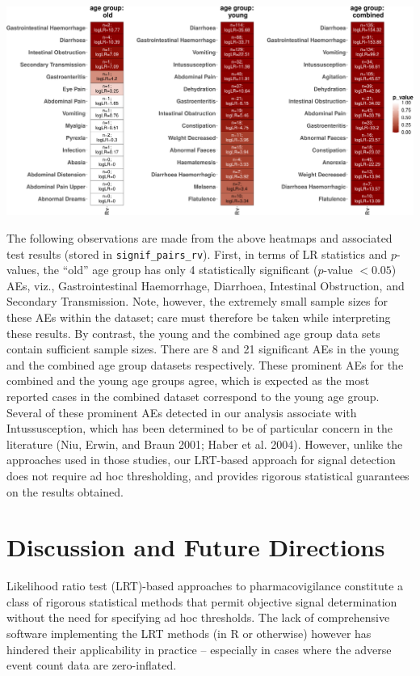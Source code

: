 \begin{center}\includegraphics[width=1\linewidth]{pvlrt-package-paper-Rjournal_files/figure-latex/heatmap-rv-all-1} \end{center}

The following observations are made from the above heatmaps and associated test results (stored in \texttt{signif\_pairs\_rv}). First, in terms of LR statistics and \(p\)-values, the ``old'' age group has only 4 statistically significant (\(p\)-value \(< 0.05\)) AEs, viz., Gastrointestinal Haemorrhage, Diarrhoea, Intestinal Obstruction, and Secondary Transmission. Note, however, the extremely small sample sizes for these AEs within the dataset; care must therefore be taken while interpreting these results. By contrast, the young and the combined age group data sets contain sufficient sample sizes. There are 8 and 21 significant AEs in the young and the combined age group datasets respectively. These prominent AEs for the combined and the young age groups agree, which is expected as the most reported cases in the combined dataset correspond to the young age group. Several of these prominent AEs detected in our analysis associate with Intussusception, which has been determined to be of particular concern in the literature (Niu, Erwin, and Braun 2001; Haber et al. 2004). However, unlike the approaches used in those studies, our LRT-based approach for signal detection does not require ad hoc thresholding, and provides rigorous statistical guarantees on the results obtained.

\hypertarget{discussion-and-future-directions}{%
\section{Discussion and Future Directions}\label{discussion-and-future-directions}}

Likelihood ratio test (LRT)-based approaches to pharmacovigilance constitute a class of rigorous statistical methods that permit objective signal determination without the need for specifying ad hoc thresholds. The lack of comprehensive software implementing the LRT methods (in R or otherwise) however has hindered their applicability in practice -- especially in cases where the adverse event count data are zero-inflated.

